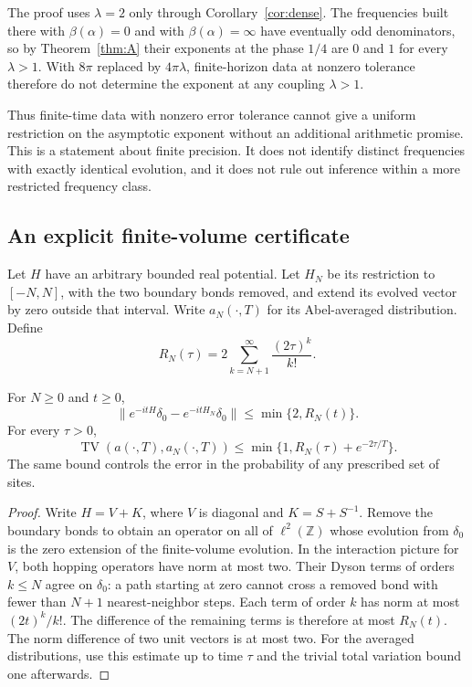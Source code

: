 The proof uses $\lambda=2$ only through Corollary~\ref{cor:dense}. The frequencies built there with $\beta(\alpha)=0$ and with $\beta(\alpha)=\infty$ have eventually odd denominators, so by Theorem~\ref{thm:A} their exponents at the phase $1/4$ are $0$ and $1$ for every $\lambda>1$. With $8\pi$ replaced by $4\pi\lambda$, finite-horizon data at nonzero tolerance therefore do not determine the exponent at any coupling $\lambda>1$.

Thus finite-time data with nonzero error tolerance cannot give a uniform
restriction on the asymptotic exponent without an additional arithmetic
promise. This is a statement about finite precision. It does not identify
distinct frequencies with exactly identical evolution, and it does not
rule out inference within a more restricted frequency class.

\subsection{An explicit finite-volume certificate}

Let $H$ have an arbitrary bounded real potential. Let $H_N$ be its restriction to
$[-N,N]$, with the two boundary bonds removed, and extend its evolved vector by zero outside that interval.
Write $a_N(\cdot,T)$ for its Abel-averaged distribution. Define
\[
R_N(\tau)=2\sum_{k=N+1}^\infty\frac{(2\tau)^k}{k!}.
\]
\begin{proposition}\label{prop:finitevolume}
For $N\ge0$ and $t\ge0$,
\[
\|e^{-itH}\delta_0-e^{-itH_N}\delta_0\|\le\min\{2,R_N(t)\}.
\]
For every $\tau>0$,
\[
\operatorname{TV}(a(\cdot,T),a_N(\cdot,T))
\le\min\{1,R_N(\tau)+e^{-2\tau/T}\}.
\]
The same bound controls the error in the probability of any prescribed set of sites.
\end{proposition}
\begin{proof}
Write $H=V+K$, where $V$ is diagonal and $K=S+S^{-1}$.
Remove the boundary bonds to obtain an operator on all of $\ell^2(\mathbb Z)$ whose evolution from $\delta_0$ is the zero extension of the finite-volume evolution.
In the interaction picture for $V$, both hopping operators have norm at most two.
Their Dyson terms of orders $k\le N$ agree on $\delta_0$: a path starting at zero cannot cross a removed bond with fewer than $N+1$ nearest-neighbor steps.
Each term of order $k$ has norm at most $(2t)^k/k!$.
The difference of the remaining terms is therefore at most $R_N(t)$.
The norm difference of two unit vectors is at most two.
For the averaged distributions, use this estimate up to time $\tau$ and the trivial total variation bound one afterwards.
\end{proof}

